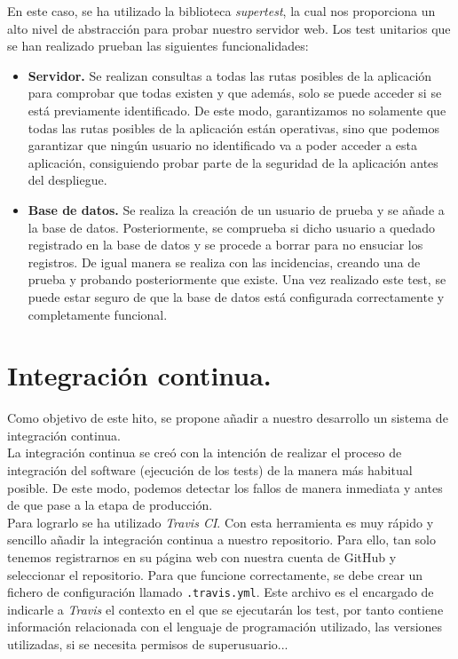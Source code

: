 En este caso, se ha utilizado la biblioteca \textit{supertest}\cite{supertest}, la cual nos proporciona un alto nivel de abstracción para probar nuestro servidor web.
Los test unitarios que se han realizado prueban las siguientes funcionalidades:

\begin{itemize}
	\item \textbf{Servidor.} Se realizan consultas a todas las rutas posibles de la aplicación para comprobar que todas existen y que además, solo se puede acceder 
	si se está previamente identificado. De este modo, garantizamos no solamente que todas las rutas posibles de la aplicación están operativas, sino que podemos garantizar
	que ningún usuario no identificado va a poder acceder a esta aplicación, consiguiendo probar parte de la seguridad de la aplicación antes del despliegue.
	\item \textbf{Base de datos.} Se realiza la creación de un usuario de prueba y se añade a la base de datos. Posteriormente, se comprueba si dicho usuario a quedado registrado
	en la base de datos y se procede a borrar para no ensuciar los registros. De igual manera se realiza con las incidencias, creando una de prueba y probando posteriormente que
	existe. Una vez realizado este test, se puede estar seguro de que la base de datos está configurada correctamente y completamente funcional.
\end{itemize}  

\section{Integración continua.}

Como objetivo de este hito, se propone añadir a nuestro desarrollo un sistema de integración continua.\\

La integración continua se creó con la intención de realizar el proceso de integración del software (ejecución de los tests) de la manera más habitual posible. De este modo, 
podemos detectar los fallos de manera inmediata y antes de que pase a la etapa de producción.\\

Para lograrlo se ha utilizado \textit{Travis CI}\cite{travis-ci}. Con esta herramienta es muy rápido y sencillo añadir la integración continua a nuestro repositorio. Para ello,
tan solo tenemos registrarnos en su página web con nuestra cuenta de GitHub y seleccionar el repositorio. Para que funcione correctamente, se debe crear un fichero de configuración
llamado \verb|.travis.yml|. Este archivo es el encargado de indicarle a \textit{Travis} el contexto en el que se ejecutarán los test, por tanto contiene
información relacionada con el lenguaje de programación utilizado, las versiones utilizadas, si se necesita permisos de superusuario...\\

